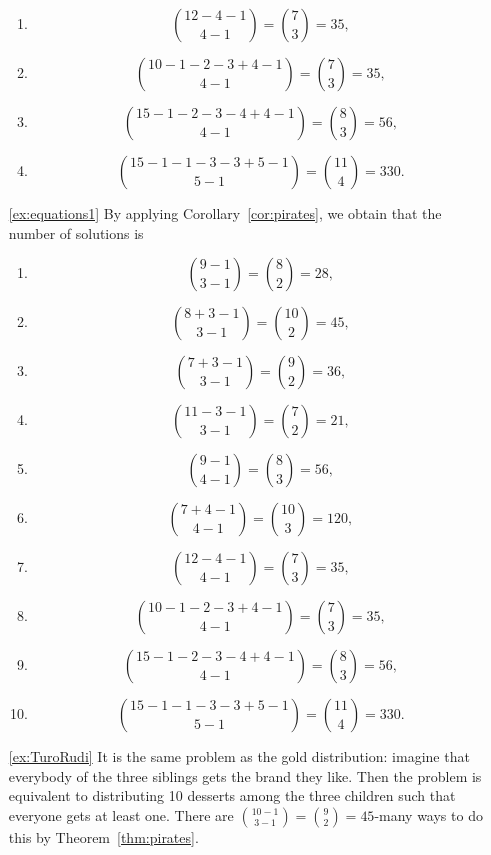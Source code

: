 \begin{enumerate}
\begin{enumerate}
\item
\[
\binom{12-4 - 1}{4 - 1} = \binom{7}{3} = 35, 
\]

\item
\[
\binom{10 -1 -2 -3 +4 - 1}{4 - 1} = \binom{7}{3} = 35, 
\]

\item
\[
\binom{15 -1 -2 -3 -4+4 - 1}{4 - 1} = \binom{8}{3} = 56, 
\]

\item
\[
\binom{15 -1 -1 -3 -3+5 - 1}{5 - 1} = \binom{11}{4} = 330. 
\]
\end{enumerate}

\item[\ref{ex:equations1}]
By applying Corollary~\ref{cor:pirates}, 
we obtain that the number of solutions is
\begin{enumerate}
\item
\[
\binom{9 - 1}{3 - 1} = \binom{8}{2} = 28, 
\]

\item
\[
\binom{8+3 - 1}{3 - 1} = \binom{10}{2} = 45, 
\]

\item
\[
\binom{7+3 - 1}{3 - 1} = \binom{9}{2} = 36, 
\]

\item
\[
\binom{11-3 - 1}{3 - 1} = \binom{7}{2} = 21, 
\]

\item
\[
\binom{9 - 1}{4 - 1} = \binom{8}{3} = 56, 
\]

\item
\[
\binom{7+4 - 1}{4 - 1} = \binom{10}{3} = 120, 
\]

\item
\[
\binom{12-4 - 1}{4 - 1} = \binom{7}{3} = 35, 
\]

\item
\[
\binom{10 -1 -2 -3 +4 - 1}{4 - 1} = \binom{7}{3} = 35, 
\]

\item
\[
\binom{15 -1 -2 -3 -4+4 - 1}{4 - 1} = \binom{8}{3} = 56, 
\]

\item
\[
\binom{15 -1 -1 -3 -3+5 - 1}{5 - 1} = \binom{11}{4} = 330. 
\]
\end{enumerate}

\item[\ref{ex:TuroRudi}]
It is the same problem as the gold distribution: 
imagine that everybody of the three siblings gets the brand they like. 
Then the problem is equivalent to distributing 10 desserts among the three children such that everyone gets at least one. 
There are $\binom{10-1}{3-1} = \binom{9}{2} = 45$-many ways to do this by Theorem~\ref{thm:pirates}. 


\end{enumerate}
